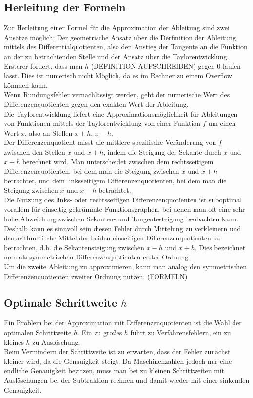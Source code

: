 \documentclass{scrartcl}
\begin{document}
\subsection{Herleitung der Formeln}
\label{ssec:herleitung}
Zur Herleitung einer Formel für die Approximation der Ableitung sind zwei Ansätze möglich: Der geometrische Ansatz über die Derfinition der Ableitung mittels des Differentialquotienten, also den Anstieg der Tangente an die Funktion an der zu betrachtenden Stelle und der Ansatz über die Taylorentwicklung. Ersterer fordert, dass man $h$ (DEFINITION AUFSCHREIBEN) gegen 0 laufen lässt. Dies ist numerisch nicht Möglich, da es im Rechner zu einem Overflow kömmen kann.\\
Wenn Rundungsfehler vernachlässigt werden, geht der numerische Wert des Differenzenquotienten gegen den exakten Wert der Ableitung. \\
Die Taylorentwicklung liefert eine Approximationsmöglichkeit für Ableitungen von Funktionen mittels der Taylorentwicklung von einer Funktion $f$ um einen Wert $x$, also an Stellen $x+h$, $x-h$.\\
Der Differenzenquotient misst die mittlere spezifische Veränderung von $f$ zwischen den Stellen $x$ und $x+h$, indem die Steigung der Sekante durch $x$ und $x+h$ berechnet wird. Man unterscheidet zwischen dem rechtsseitigem Differenzenquotienten, bei dem man die Steigung zwischen $x$ und $x+h$ betrachtet, und dem linksseitigem Differenzenquotienten, bei dem man die Steigung zwischen $x$ und $x-h$ betrachtet.\\
Die Nutzung des links- oder rechtsseitigen Differenzenquotienten ist suboptimal vorallem für einseitig gekrümmte Funktionsgraphen, bei denen man oft eine sehr hohe Abweichung zwischen Sekanten- und Tangentesteigung beobachten kann. Deshalb kann es sinnvoll sein diesen Fehler durch Mittelung zu verkleinern und das arithmetische Mittel der beiden einseitigen Differenzenquotienten zu betrachten, d.h. die Sekantensteigung zwischen $x-h$ und $x+h$. Dies bezeichnet man als symmetrischen Differenzenquotienten erster Ordnung.\\
Um die zweite Ableitung zu approximieren, kann man analog den symmetrischen Differenzenquotienten zweiter Ordnung nutzen. (FORMELN)\\

\subsection{Optimale Schrittweite $h$}
\label{ssec:schrittweite}
Ein Problem bei der Approximation mit Differenzenquotienten ist die Wahl der optimalen Schrittweite $h$. Ein zu großes $h$ führt zu Verfahrensfehlern, ein zu kleines $h$ zu Auslöschung.\\
Beim Vermindern der Schrittweite ist zu erwarten, dass der Fehler zunächst kleiner wird, da die Genauigkeit steigt. Da Maschinenzahlen jedoch nur eine endliche Genauigkeit bezitzen, muss man bei zu kleinen Schrittweiten mit Auslöschungen bei der Subtraktion rechnen und damit wieder mit einer sinkenden Genauigkeit.
\end{document}
